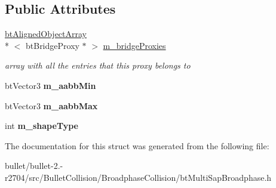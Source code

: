 \subsection*{Public Attributes}
\begin{DoxyCompactItemize}
\item 
\hypertarget{structbt_multi_sap_broadphase_1_1bt_multi_sap_proxy_a922dfc7570ba4f9b3dc768bc4f774d8b}{\hyperlink{classbt_aligned_object_array}{bt\+Aligned\+Object\+Array}\\*
$<$ bt\+Bridge\+Proxy $\ast$ $>$ \hyperlink{structbt_multi_sap_broadphase_1_1bt_multi_sap_proxy_a922dfc7570ba4f9b3dc768bc4f774d8b}{m\+\_\+bridge\+Proxies}}\label{structbt_multi_sap_broadphase_1_1bt_multi_sap_proxy_a922dfc7570ba4f9b3dc768bc4f774d8b}

\begin{DoxyCompactList}\small\item\em array with all the entries that this proxy belongs to \end{DoxyCompactList}\item 
\hypertarget{structbt_multi_sap_broadphase_1_1bt_multi_sap_proxy_a3b295f71a367a02835947deb6e7ab420}{bt\+Vector3 {\bfseries m\+\_\+aabb\+Min}}\label{structbt_multi_sap_broadphase_1_1bt_multi_sap_proxy_a3b295f71a367a02835947deb6e7ab420}

\item 
\hypertarget{structbt_multi_sap_broadphase_1_1bt_multi_sap_proxy_afef1b4b0aa785503e897cd98d2e7edb4}{bt\+Vector3 {\bfseries m\+\_\+aabb\+Max}}\label{structbt_multi_sap_broadphase_1_1bt_multi_sap_proxy_afef1b4b0aa785503e897cd98d2e7edb4}

\item 
\hypertarget{structbt_multi_sap_broadphase_1_1bt_multi_sap_proxy_a03bffba0e486df8d68fb43005cbe4587}{int {\bfseries m\+\_\+shape\+Type}}\label{structbt_multi_sap_broadphase_1_1bt_multi_sap_proxy_a03bffba0e486df8d68fb43005cbe4587}

\end{DoxyCompactItemize}


The documentation for this struct was generated from the following file\+:\begin{DoxyCompactItemize}
\item 
bullet/bullet-\/2.-\/r2704/src/\+Bullet\+Collision/\+Broadphase\+Collision/bt\+Multi\+Sap\+Broadphase.\+h\end{DoxyCompactItemize}
